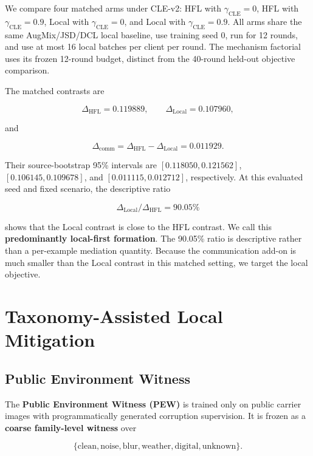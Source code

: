 We compare four matched arms under CLE-v2: HFL with \(\gamma_{\mathrm{CLE}}=0\), HFL with \(\gamma_{\mathrm{CLE}}=0.9\), Local with \(\gamma_{\mathrm{CLE}}=0\), and Local with \(\gamma_{\mathrm{CLE}}=0.9\). All arms share the same AugMix/JSD/DCL local baseline, use training seed 0, run for 12 rounds, and use at most 16 local batches per client per round. The mechanism factorial uses its frozen 12-round budget, distinct from the 40-round held-out objective comparison.



The matched contrasts are

\[
\Delta_{\mathrm{HFL}}=0.119889,\qquad
\Delta_{\mathrm{Local}}=0.107960,
\]

and

\[
\Delta_{\mathrm{comm}}
=\Delta_{\mathrm{HFL}}-\Delta_{\mathrm{Local}}
=0.011929.
\]

Their source-bootstrap 95\% intervals are \([0.118050,0.121562]\), \([0.106145,0.109678]\), and \([0.011115,0.012712]\), respectively. At this evaluated seed and fixed scenario, the descriptive ratio

\[
\Delta_{\mathrm{Local}}/\Delta_{\mathrm{HFL}}=90.05\%
\]

shows that the Local contrast is close to the HFL contrast. We call this \textbf{predominantly local-first formation}. The 90.05\% ratio is descriptive rather than a per-example mediation quantity. Because the communication add-on is much smaller than the Local contrast in this matched setting, we target the local objective.


\section{Taxonomy-Assisted Local Mitigation}

\subsection{Public Environment Witness}

The \textbf{Public Environment Witness (PEW)} is trained only on public carrier images with programmatically generated corruption supervision. It is frozen as a \textbf{coarse family-level witness} over

\[
\{\text{clean},\text{noise},\text{blur},\text{weather},\text{digital},\text{unknown}\}.
\]

